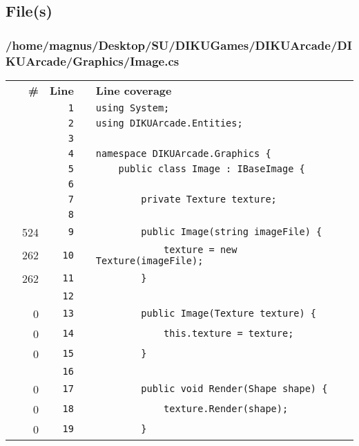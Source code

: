 \documentclass[a4paper,landscape,10pt]{article}
\begin{document}
\subsection{File(s)}
\subsubsection{/home/magnus/Desktop/SU/DIKUGames/DIKUArcade/DIKUArcade/Graphics/Image.cs}
\begin{longtable}[l]{lrrll}
\textbf{} & \textbf{\#} & \textbf{Line} & \textbf{} & \textbf{Line coverage}\\
\cellcolor{gray} &  & \verb~1~ & & \verb~using System;~\\
\cellcolor{gray} &  & \verb~2~ & & \verb~using DIKUArcade.Entities;~\\
\cellcolor{gray} &  & \verb~3~ & & \verb~~\\
\cellcolor{gray} &  & \verb~4~ & & \verb~namespace DIKUArcade.Graphics {~\\
\cellcolor{gray} &  & \verb~5~ & & \verb~    public class Image : IBaseImage {~\\
\cellcolor{gray} &  & \verb~6~ & & \verb~~\\
\cellcolor{gray} &  & \verb~7~ & & \verb~        private Texture texture;~\\
\cellcolor{gray} &  & \verb~8~ & & \verb~~\\
\cellcolor{green} & 524 & \verb~9~ & & \verb~        public Image(string imageFile) {~\\
\cellcolor{green} & 262 & \verb~10~ & & \verb~            texture = new Texture(imageFile);~\\
\cellcolor{green} & 262 & \verb~11~ & & \verb~        }~\\
\cellcolor{gray} &  & \verb~12~ & & \verb~~\\
\cellcolor{red} & 0 & \verb~13~ & & \verb~        public Image(Texture texture) {~\\
\cellcolor{red} & 0 & \verb~14~ & & \verb~            this.texture = texture;~\\
\cellcolor{red} & 0 & \verb~15~ & & \verb~        }~\\
\cellcolor{gray} &  & \verb~16~ & & \verb~~\\
\cellcolor{red} & 0 & \verb~17~ & & \verb~        public void Render(Shape shape) {~\\
\cellcolor{red} & 0 & \verb~18~ & & \verb~            texture.Render(shape);~\\
\cellcolor{red} & 0 & \verb~19~ & & \verb~        }~\\

\end{longtable}
\end{document}
